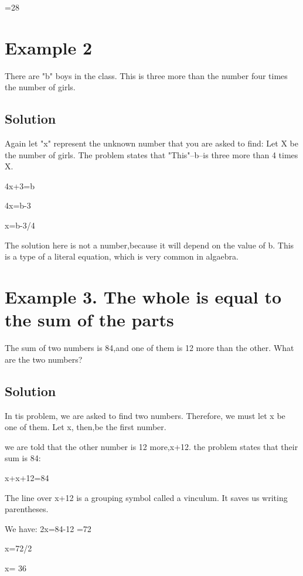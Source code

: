 \documentclass[12pt]{article}%
\begin{document}
                                 =28





\section{Example 2}
There are "b" boys in the class. This is three more than the number four times the number of girls.
\subsection {Solution}
Again let "x" represent the unknown number that you are asked to find: Let X be the number of girls. The problem states that "This"--b--is three more than 4 times X. 
          
          4x+3=b
          
          4x=b-3
          
          x=b-3/4
          
 The solution here is not a number,because it will depend on the value of b. This is a type of a literal equation, which is very common in algaebra.

\section{Example 3. The whole is equal to the sum of the parts}

The sum of two numbers is 84,and one of them is 12 more than the other. What are the two numbers?

\subsection{Solution}
In tis problem, we are asked to find two numbers. Therefore, we must let x be one of them. Let x, then,be the first number.

  we are told that the other number is 12 more,x+12.
  the problem states that their sum is 84: 
                         
                       x+x+12=84
                       
 The line over x+12 is a grouping symbol called a vinculum. It saves us writing parentheses.
 
 We have:
 2x=84-12
          =72
          
          x=72/2
          
          x= 36
          
\end{document}
